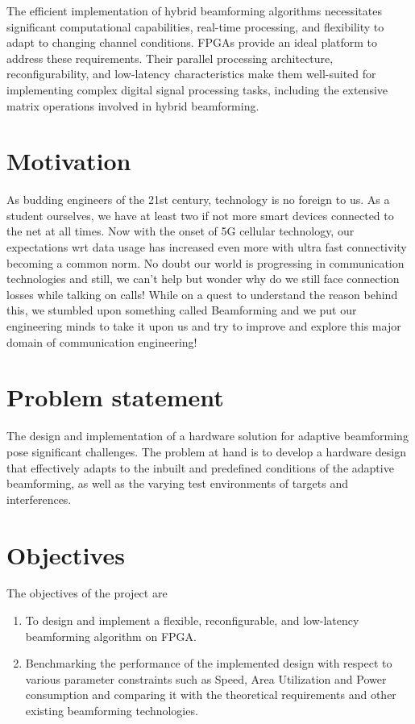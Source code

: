 The efficient implementation of hybrid beamforming algorithms necessitates significant computational capabilities, real-time processing, and flexibility to adapt to changing channel conditions. FPGAs provide an ideal platform to address these requirements. Their parallel processing architecture, reconfigurability, and low-latency characteristics make them well-suited for implementing complex digital signal processing tasks, including the extensive matrix operations involved in hybrid beamforming.

\section[Motivation]{\textbf{Motivation}}

As budding engineers of the 21st century, technology is no foreign to us. As a student ourselves, we have at least two if not more smart devices connected to the net at all times. Now with the onset of 5G cellular technology, our expectations wrt data usage has increased even more with ultra fast connectivity becoming a common norm. No doubt our world is progressing in communication technologies and still, we can’t help but wonder why do we still face connection losses while talking on calls! While on a quest to understand the reason behind this, we stumbled upon something called Beamforming and we put our engineering minds to take it upon us and try to improve and explore this major domain of communication engineering! 


\section[Problem statement]{\textbf{Problem statement}}

The design and implementation of a hardware solution for adaptive beamforming pose significant challenges. The problem at hand is to develop a hardware design that effectively adapts to the inbuilt and predefined conditions of the adaptive beamforming, as well as the varying test environments of targets and interferences.

\section[Objectives]{\textbf{Objectives}}
The objectives of the project are
\begin{enumerate}
\item To design and implement a flexible, reconfigurable, and low-latency beamforming algorithm on FPGA.
\item Benchmarking the performance of the implemented design with respect to various parameter constraints such as Speed, Area Utilization and Power consumption and comparing it with the theoretical requirements and other existing beamforming technologies.
\end{enumerate}


